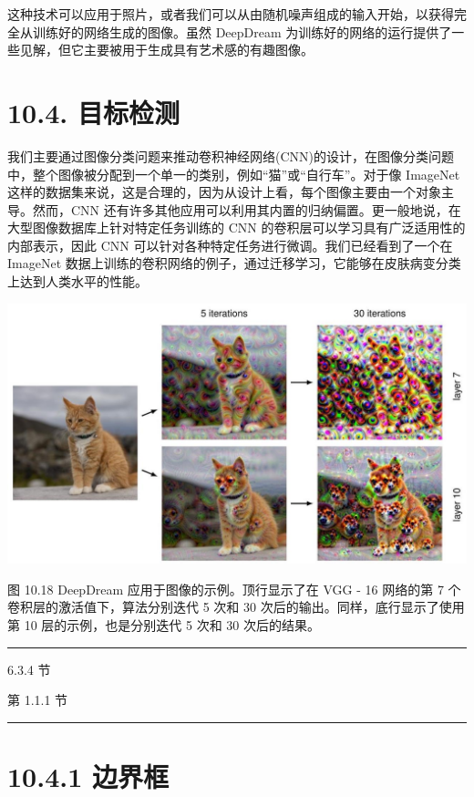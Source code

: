 \documentclass[10pt]{report}
\newcommand{\HRule}{\begin{center}\rule{0.9\linewidth}{0.2mm}\end{center}}
\begin{document}
这种技术可以应用于照片，或者我们可以从由随机噪声组成的输入开始，以获得完全从训练好的网络生成的图像。虽然 DeepDream 为训练好的网络的运行提供了一些见解，但它主要被用于生成具有艺术感的有趣图像。

\section*{10.4. 目标检测}

我们主要通过图像分类问题来推动卷积神经网络(CNN)的设计，在图像分类问题中，整个图像被分配到一个单一的类别，例如“猫”或“自行车”。对于像 ImageNet 这样的数据集来说，这是合理的，因为从设计上看，每个图像主要由一个对象主导。然而，CNN 还有许多其他应用可以利用其内置的归纳偏置。更一般地说，在大型图像数据库上针对特定任务训练的 CNN 的卷积层可以学习具有广泛适用性的内部表示，因此 CNN 可以针对各种特定任务进行微调。我们已经看到了一个在 ImageNet 数据上训练的卷积网络的例子，通过迁移学习，它能够在皮肤病变分类上达到人类水平的性能。

\begin{center}
\includegraphics[max width=1.0\textwidth]{images/0194e279-9b28-703a-88f4-c3ac21e2010d_328_247_351_1301_737_0.jpg}
\end{center}
\hspace*{3em} 

图 10.18 DeepDream 应用于图像的示例。顶行显示了在 VGG - 16 网络的第 7 个卷积层的激活值下，算法分别迭代 5 次和 30 次后的输出。同样，底行显示了使用第 10 层的示例，也是分别迭代 5 次和 30 次后的结果。

\HRule

6.3.4 节

第 1.1.1 节

\HRule

\section*{10.4.1 边界框}
\end{document}
